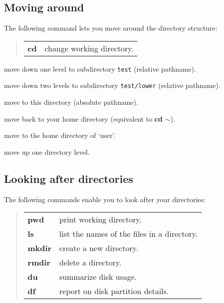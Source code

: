 \subsection{Moving around}

The following command lets you move around the directory structure:

\begin{quote}
\begin{tabular}{lp{67mm}}

{\bf cd}  & change working directory.

\end{tabular}
\end{quote}

\goodbreak

\exbegin

{move down one level to subdirectory {\tt test} (relative pathname).}

{move down two levels to subdirectory {\tt test/lower} (relative pathname).}

{move to this directory (absolute pathname).}

{move back to your home directory (equivalent to {\bf cd $\sim$}).}

{move to the home directory of `user'.}

{move up one directory level.}

\exend

\subsection{Looking after directories}

The following commands enable you to look after your directories:

\begin{quote}
\begin{tabular}{lp{67mm}}

{\bf pwd}   & print working directory.\\
{\bf ls}    & list the names of the files in a directory.\\
{\bf mkdir} & create a new directory.\\
{\bf rmdir} & delete a directory.\\
{\bf du}    & summarize disk usage.\\
{\bf df}    & report on disk partition details.

\end{tabular}
\end{quote}

